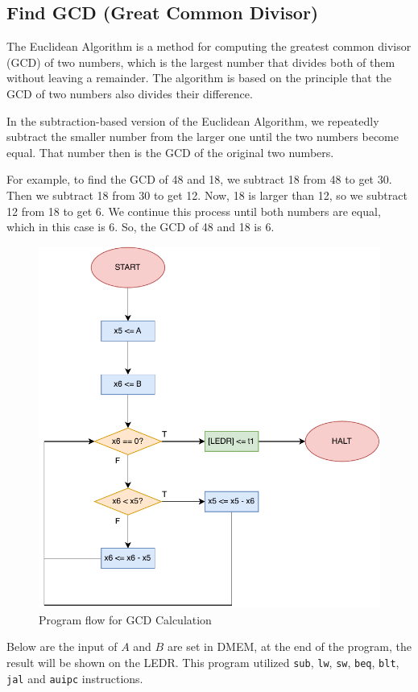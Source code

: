 \documentclass[12pt,a4paper,oneside]{book} %
\begin{document}
\subsection{Find GCD (Great Common Divisor)}

The Euclidean Algorithm is a method for computing the greatest common divisor (GCD) of two numbers, which is the largest number that divides both of them without leaving a remainder. The algorithm is based on the principle that the GCD of two numbers also divides their difference.

In the subtraction-based version of the Euclidean Algorithm, we repeatedly subtract the smaller number from the larger one until the two numbers become equal. That number then is the GCD of the original two numbers.

For example, to find the GCD of 48 and 18, we subtract 18 from 48 to get 30. Then we subtract 18 from 30 to get 12. Now, 18 is larger than 12, so we subtract 12 from 18 to get 6. We continue this process until both numbers are equal, which in this case is 6. So, the GCD of 48 and 18 is 6.

\begin{figure}[H]
    \centering
    \includegraphics[width=.75\textwidth]{images/flowchart/gcd.pdf}
    \caption{Program flow for GCD Calculation}
\end{figure}

Below are the input of $A$ and $B$ are set in DMEM, at the end of the program, the result will be shown on the LEDR. This program utilized \texttt{sub}, \texttt{lw}, \texttt{sw}, \texttt{beq}, \texttt{blt}, \texttt{jal} and \texttt{auipc} instructions.
\end{document}
